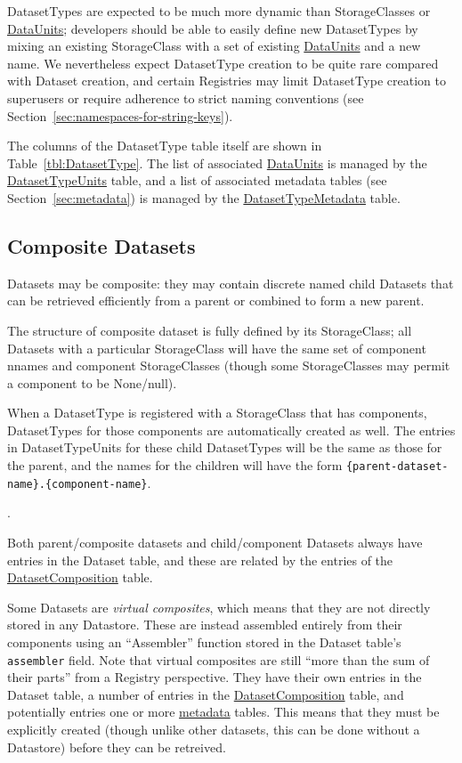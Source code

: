 \documentclass[DM,toc]{lsstdoc}
\newcommand{\tblref}[1]{\hyperref[tbl:#1]{#1}}
\newcommand{\coltable}[1]{
    \begin{table}[htb]
        {
            \footnotesize
            
        }
        \caption{#1 Columns}
        \label{tbl:#1}
    \end{table}
}
\begin{document}
DatasetTypes are expected to be much more dynamic than StorageClasses or \hyperref[sec:dataunits]{DataUnits}; developers should be able to easily define new DatasetTypes by mixing an existing StorageClass with a set of existing \hyperref[sec:dataunits]{DataUnits} and a new name.
We nevertheless expect DatasetType creation to be quite rare compared with Dataset creation, and certain Registries may limit DatasetType creation to superusers or require adherence to strict naming conventions (see Section~\ref{sec:namespaces-for-string-keys}).

The columns of the DatasetType table itself are shown in Table~\ref{tbl:DatasetType}.
The list of associated \hyperref[sec:dataunits]{DataUnits} is managed by the \tblref{DatasetTypeUnits} table, and a list of associated metadata tables (see Section~\ref{sec:metadata}) is managed by the \tblref{DatasetTypeMetadata} table.

\coltable{DatasetType}
\coltable{DatasetTypeUnits}
\coltable{DatasetTypeMetadata}


\subsection{Composite Datasets}
\label{sec:composite-datasets}

Datasets may be composite: they may contain discrete named child Datasets that can be retrieved efficiently from a parent or combined to form a new parent.

The structure of composite dataset is fully defined by its StorageClass; all Datasets with a particular StorageClass will have the same set of component nnames and component StorageClasses (though some StorageClasses may permit a component to be None/null).

When a DatasetType is registered with a StorageClass that has components, DatasetTypes for those components are automatically created as well.
The entries in DatasetTypeUnits for these child DatasetTypes will be the same as those for the parent, and the names for the children will have the form \texttt{\{parent-dataset-name\}.\{component-name\}}.

\coltable{DatasetComposition}.

Both parent/composite datasets and child/component Datasets always have entries in the Dataset table, and these are related by the entries of the \tblref{DatasetComposition} table.

Some Datasets are \emph{virtual composites}, which means that they are not
directly stored in any Datastore.
These are instead assembled entirely from their components using an ``Assembler'' function stored in the Dataset table's \texttt{assembler} field.
Note that virtual composites are still ``more than the sum of their parts'' from a Registry perspective.
They have their own entries in the Dataset table, a number of entries in the \tblref{DatasetComposition} table, and potentially entries one or more \hyperref[sec:metadata]{metadata} tables.
This means that they must be explicitly created (though unlike other datasets, this can be done without a Datastore) before they can be retreived.
\end{document}
